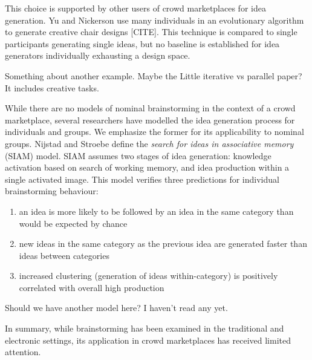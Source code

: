 This choice is supported by other users of crowd marketplaces for idea generation. Yu and Nickerson use many individuals in an evolutionary algorithm to generate creative chair designs [CITE]. This technique is compared to single participants generating single ideas, but no baseline is established for idea generators individually exhausting a design space.

Something about another example. Maybe the Little iterative vs parallel paper? It includes creative tasks.


While there are no models of nominal brainstorming in the context of a crowd marketplace, several researchers have modelled the idea generation process for individuals and groups. We emphasize the former for its applicability to nominal groups. Nijstad and Stroebe define the \emph{search for ideas in associative memory} (SIAM) model. SIAM assumes two stages of idea generation: knowledge activation based on search of working memory, and idea production within a single activated image. This model verifies three predictions for individual brainstorming behaviour:

\begin{enumerate}
\item an idea is more likely to be followed by an idea in the same category than would be expected by chance
\item new ideas in the same category as the previous idea are generated faster than ideas between categories
\item increased clustering (generation of ideas within-category) is positively correlated with overall high production
\end{enumerate}

Should we have another model here? I haven't read any yet.

In summary, while brainstorming has been examined in the traditional and electronic settings, its application in crowd marketplaces has received limited attention. 